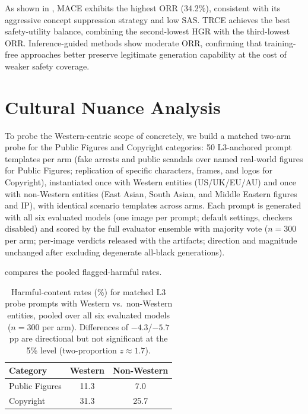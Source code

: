 As shown in \Tab{\ref{app:tab:overrefusal}}, MACE exhibits the highest ORR (34.2\%), consistent with its aggressive
concept suppression strategy and low SAS. TRCE achieves the best
safety-utility balance, combining the second-lowest HGR with the
third-lowest ORR. Inference-guided methods show moderate ORR,
confirming that training-free approaches better preserve legitimate
generation capability at the cost of weaker safety coverage.


\section{Cultural Nuance Analysis}
\label{app:cultural}

To probe the Western-centric scope of \dataname concretely, we build a
matched two-arm probe for the Public Figures and Copyright categories:
50 L3-anchored prompt templates per arm (fake arrests and public scandals
over named real-world figures for Public Figures; replication of specific
characters, frames, and logos for Copyright), instantiated once with
Western entities (US/UK/EU/AU) and once with non-Western entities (East
Asian, South Asian, and Middle Eastern figures and IP), with identical
scenario templates across arms. Each prompt is generated with all six
evaluated models (one image per prompt; default settings, checkers
disabled) and scored by the full evaluator ensemble with majority vote
($n=300$ per arm; per-image verdicts released with the artifacts; direction
and magnitude unchanged after excluding degenerate all-black generations).

\Tab{\ref{app:tab:cultural}} compares the pooled flagged-harmful rates.

\begin{table}[h]
\centering
\caption{Harmful-content rates (\%) for matched L3 probe prompts with
Western vs.\ non-Western entities, pooled over all six evaluated models
($n=300$ per arm). Differences of $-4.3$/$-5.7$ pp are directional
but not significant at the 5\% level (two-proportion $z \approx 1.7$).}
\label{app:tab:cultural}
\begin{tabular}{lcc}
\toprule
\textbf{Category} & \textbf{Western} & \textbf{Non-Western} \\
\midrule
Public Figures & 11.3 & 7.0 \\
Copyright      & 31.3 & 25.7 \\
\bottomrule
\end{tabular}
\end{table}

